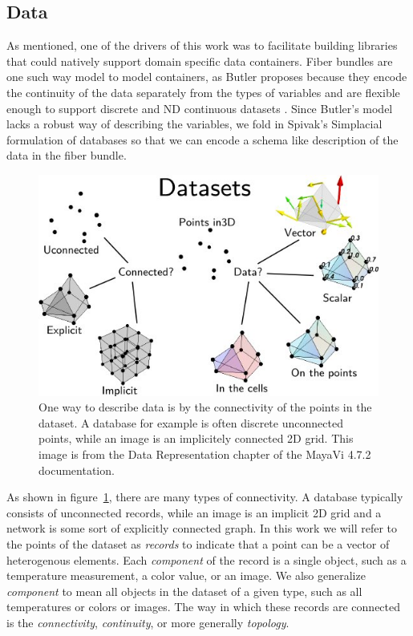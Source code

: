 \documentclass[../main.tex]{subfiles}
\begin{document}
\subsection{Data}
\label{sec:intro_data}
As mentioned, one of the drivers of this work was to facilitate building libraries that could natively support domain specific data containers. Fiber bundles are one such way model to model containers, as Butler proposes because they encode the continuity of the data separately from the types of variables and are flexible enough to support discrete and ND continuous datasets \cite{butlerVisualizationModelBased1989,butlerVectorBundleClassesForm1992}. Since Butler's model lacks a robust way of describing the variables, we fold in Spivak's Simplacial formulation of databases \cite{spivakDatabasesAreCategories2010,spivakSIMPLICIALDATABASES} so that we can encode a schema like description of the data in the fiber bundle.

\begin{figure}[H]
    \includegraphics[width=1\textwidth]{figures/intro/dataset_diagram.png}
    \caption{One way to describe data is by the connectivity of the points in the dataset. A database for example is often discrete unconnected points, while an image is an implicitely connected 2D grid. This image is from the Data Representation chapter of the MayaVi 4.7.2 documentation.\cite{DataRepresentationMayavi}}
    \label{fig:intro_data_format}
\end{figure}
As shown in figure~\ref{fig:intro_data_format}, there are many types of connectivity. A database typically consists of unconnected records, while an image is an implicit 2D grid and a network is some sort of explicitly connected graph.  In this work we will refer to the points of the dataset as \textit{records} to indicate that a point can be a vector of heterogenous elements. Each \textit{component} of the record is a single object, such as a temperature measurement, a color value, or an image. We also generalize \textit{component} to mean all objects in the dataset of a given type, such as all temperatures or colors or images. The way in which these records are connected is the \textit{connectivity}, \textit{continuity}, or more generally \textit{topology}.
\end{document}

